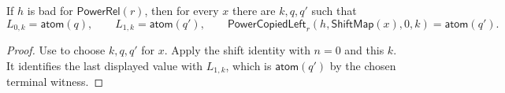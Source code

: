 \begin{lemma}
If $h$ is bad for $\mathsf{PowerRel}(r)$, then for every $x$ there are
$k,q,q'$ such that
\[
L_{0,k}=\mathsf{atom}(q),\qquad
L_{1,k}=\mathsf{atom}(q'),\qquad
\mathsf{PowerCopiedLeft}_r(h,\mathsf{ShiftMap}(x),0,k)
=\mathsf{atom}(q').
\]
\end{lemma}
\begin{proof}
Use  to choose $k,q,q'$ for $x$.  Apply
the shift identity  with $n=0$ and this
$k$.  It identifies the last displayed value with $L_{1,k}$, which is
$\mathsf{atom}(q')$ by the chosen terminal witness.
\end{proof}
